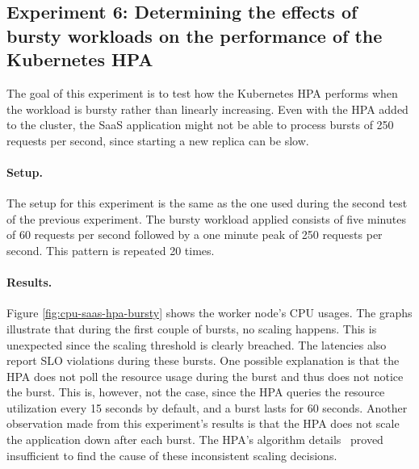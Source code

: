 \subsection{Experiment 6: Determining the effects of bursty workloads on the performance of the Kubernetes HPA}
The goal of this experiment is to test how the Kubernetes HPA performs when the workload is bursty rather than linearly increasing. Even with the HPA added to the cluster, the SaaS application might not be able to process bursts of 250 requests per second, since starting a new replica can be slow. %


\paragraph{Setup.}
The setup for this experiment is the same as the one used during the second test of the previous experiment. The bursty workload applied consists of five minutes of 60 requests per second followed by a one minute peak of 250 requests per second. This pattern is repeated 20 times.  

\paragraph{Results.}
Figure \ref{fig:cpu-saas-hpa-bursty} shows the worker node's CPU usages. The graphs illustrate that during the first couple of bursts, no scaling happens. This is unexpected since the scaling threshold is clearly breached. The latencies also report SLO violations during these bursts. One possible explanation is that the HPA does not poll the resource usage during the burst and thus does not notice the burst. This is, however, not the case, since the HPA queries the resource utilization every 15 seconds by default, and a burst lasts for 60 seconds. Another observation made from this experiment's results is that the HPA does not scale the application down after each burst. The HPA's algorithm details~\citep{hpa-algorithm-details} proved insufficient to find the cause of these inconsistent scaling decisions. 


